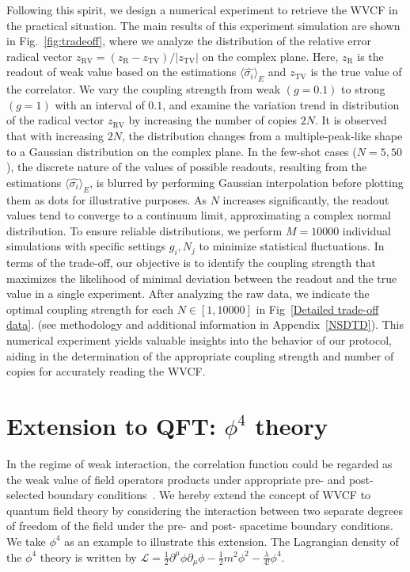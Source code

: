 \documentclass[twocolumn,pra,aps,superscriptaddress]{revtex4-2}
\begin{document}
Following this spirit, we design a numerical experiment to retrieve the WVCF  in the practical situation. The main results of this experiment simulation are shown in Fig.~\ref{fig:tradeoff},  where we analyze  the distribution of the relative error radical vector $z_{\text{RV}}=\left(z_{\text{R}}-z_{\text{TV}} \right) / |z_{\text{TV}}|$ on the complex plane. Here, $z_{\text{R}}$ is the readout of weak value based on the estimations $\langle\hat{\sigma_i}\rangle_E$ and $z_{\text{TV}}$ is the true value of the correlator. We vary the coupling strength from weak $(g=0.1)$ to strong $(g=1)$ with an interval of $0.1$, and examine the variation trend in distribution of the radical vector $z_{\text{RV}}$ by increasing the number of copies $2N$.  It is  observed that with increasing $2N$, the distribution changes from a multiple-peak-like shape to a Gaussian distribution on the complex plane. In the few-shot cases ($N=5, 50$), the discrete nature of the values of possible readouts, resulting from the estimations $\langle\hat{\sigma_i}\rangle_E$, is blurred by performing Gaussian interpolation before plotting them as dots for illustrative purposes. As $N$ increases significantly, the readout values tend to converge to a continuum limit, approximating a complex normal distribution. To ensure reliable distributions, we perform $M=10000$ individual simulations with specific settings ${g_i, N_j}$ to minimize statistical fluctuations. In terms of the trade-off, our objective is to identify the coupling strength that maximizes the likelihood of minimal deviation between the readout and the true value in a single experiment. After analyzing the raw data, we indicate the optimal coupling strength for each $N\in [1,10000]$ in Fig~\ref{Detailed trade-off data}. (see methodology and additional information in Appendix~\ref{NSDTD}). This numerical experiment yields valuable insights into the behavior of our protocol, aiding in the determination of the appropriate coupling strength and number of copies for accurately reading the WVCF.




\section {Extension to QFT: $\phi^4$ theory}\label{PHI4}

In the regime of weak interaction, the correlation function could be regarded as the weak value of field operators products under appropriate pre- and post-selected boundary conditions~\cite{dressel}. We hereby extend the concept of WVCF to quantum field theory by considering the interaction between two separate degrees of freedom of the field under the pre- and post- spacetime boundary conditions. We take $\phi^4$ as an example to illustrate this extension. The Lagrangian density of the  $\phi^4$ theory is written by  $\mathcal{L}=\frac{1}{2}\partial^\mu\phi\partial_\mu\phi-\frac{1}{2}m^2\phi^2-\frac{\lambda}{4!}\phi^4$.
\end{document}
